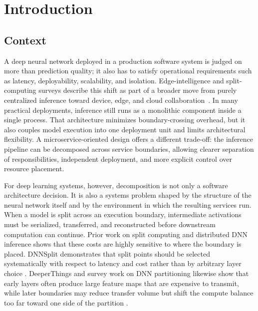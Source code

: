 \chapter{Introduction}\label{ch:introduction}

\section{Context}
A deep neural network deployed in a production software system is judged on more than prediction quality; it also has to satisfy operational requirements such as latency, deployability, scalability, and isolation. Edge-intelligence and split-computing surveys describe this shift as part of a broader move from purely centralized inference toward device, edge, and cloud collaboration~\cite{edge_intelligence,split_computing_survey}. In many practical deployments, inference still runs as a monolithic component inside a single process. That architecture minimizes boundary-crossing overhead, but it also couples model execution into one deployment unit and limits architectural flexibility. A microservice-oriented design offers a different trade-off: the inference pipeline can be decomposed across service boundaries, allowing clearer separation of responsibilities, independent deployment, and more explicit control over resource placement.

For deep learning systems, however, decomposition is not only a software architecture decision. It is also a systems problem shaped by the structure of the neural network itself and by the environment in which the resulting services run. When a model is split across an execution boundary, intermediate activations must be serialized, transferred, and reconstructed before downstream computation can continue. Prior work on split computing and distributed DNN inference shows that these costs are highly sensitive to where the boundary is placed. DNNSplit demonstrates that split points should be selected systematically with respect to latency and cost rather than by arbitrary layer choice \cite{dnnsplit}. DeeperThings and survey work on DNN partitioning likewise show that early layers often produce large feature maps that are expensive to transmit, while later boundaries may reduce transfer volume but shift the compute balance too far toward one side of the partition \cite{deeperthings, survey_partitioning}.

